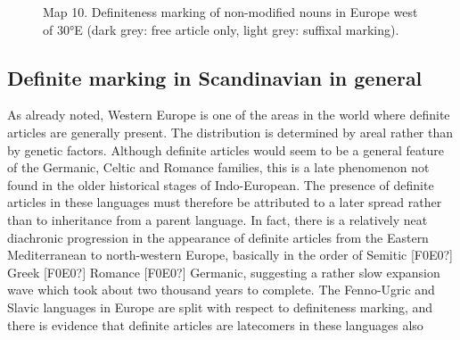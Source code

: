 \begin{figure}[h]

\begin{minipage}{5.58403in}

\label{bkm:Ref224379647}Map 10. Definiteness marking of non-modified nouns in Europe west of 30°E (dark grey: free article only, light grey: suffixal marking).


\end{minipage}

\end{figure}

\subsection{ Definite marking in Scandinavian in general}
\label{bkm:Ref224380083}
As already noted, Western Europe is one of the areas in the world where definite articles are generally present. The distribution is determined by areal rather than by genetic factors. Although definite articles would seem to be a general feature of the Germanic, Celtic and Romance families, this is a late phenomenon not found in the older historical stages of Indo-European. The presence of definite articles in these languages must therefore be attributed to a later spread rather than to inheritance from a parent language. In fact, there is a relatively neat diachronic progression in the appearance of definite articles from the Eastern Mediterranean to north-western Europe, basically in the order of Semitic [F0E0?] Greek [F0E0?] Romance [F0E0?] Germanic, suggesting a rather slow expansion wave which took about two thousand years to complete. The Fenno-Ugric and Slavic languages in Europe are split with respect to definiteness marking, and there is evidence that definite articles are latecomers in these languages also



